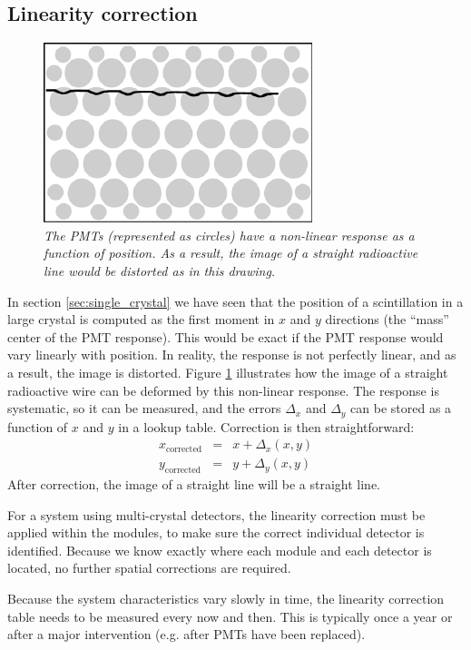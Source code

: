 \subsection{Linearity correction}
\begin{figure}[tb]
\centering
\includegraphics[width=\figone]{figs/fig_linearity.pdf}
\caption{\label{fig:linearity} \emph{The PMTs (represented as circles) have a
non-linear response as a function of position. As a result, the image of a
straight radioactive line would be distorted as in this drawing.}}
\end{figure}

In section \ref{sec:single_crystal} we have seen that the position of
a scintillation in a large crystal is computed as the first moment in
$x$ and $y$ directions (the ``mass'' center of the PMT response). This
would be exact if the PMT response would vary linearly with
position. In reality, the response is not perfectly linear, and as a
result, the image is distorted. Figure \ref{fig:linearity} illustrates
how the image of a straight radioactive wire can be deformed by this
non-linear response. The response is systematic, so it can be
measured, and the errors $\Delta_x$ and $\Delta_y$ can be stored as a
function of $x$ and $y$ in a lookup table. Correction is then
straightforward:
\begin{eqnarray}
 x_{\mbox{corrected}} & = & x + \Delta_x(x,y) \nonumber\\
 y_{\mbox{corrected}} & = & y + \Delta_y(x,y)
\end{eqnarray}
After correction, the image of a straight line will be a straight line.

For a system using multi-crystal detectors, the linearity correction must be
applied within the modules, to make sure the correct individual detector is
identified. Because we know exactly where each module and each detector is
located, no further spatial corrections are required.

Because the system characteristics vary slowly in time, the linearity
correction table needs to be measured every now and then. This is typically
once a year or after a major intervention (e.g. after PMTs have been
replaced).

